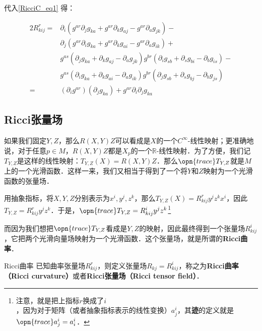代入\autoref{RicciC_eq1} 得：

\begin{equation}
\begin{aligned}
2R^r_{kij}=&\partial_i(g^{ar}\partial_jg_{ka}+g^{ar}\partial_kg_{aj}-g^{ar}\partial_ag_{jk})-\\
&\partial_j(g^{ar}\partial_ig_{ka}+g^{ar}\partial_kg_{ai}-g^{ar}\partial_ag_{ik})+\\
&g^{as}(\partial_jg_{ka}+\partial_kg_{aj}-\partial_ag_{jk})g^{br}(\partial_ig_{sb}+\partial_sg_{bi}-\partial_bg_{is})-\\
&g^{as}(\partial_ig_{ka}+\partial_kg_{ai}-\partial_ag_{ik})g^{br}(\partial_jg_{sb}+\partial_sg_{bj}-\partial_bg_{js})\\
=&(\partial_ig^{ar})(\partial_jg_{ka})+g^{ar}\partial_i\partial_jg_{ka}
\end{aligned}
\end{equation}

















\subsection{Ricci张量场}

如果我们固定$Y, Z$，那么$R(X, Y)Z$可以看成是$X$的一个$C^{\infty}$-线性映射；更准确地说，对于任意$p\in M$，$R(X, Y)Z$都是$X_p$的一个$\mathbb{R}$-线性映射．为了方便，我们记$T_{Y, Z}$是这样的线性映射：$T_{Y, Z}(X)=R(X, Y)Z$．那么$\opn{trace}T_{Y, Z}$就是$M$上的一个光滑函数．这样一来，我们又相当于得到了一个将$Y$和$Z$映射为一个光滑函数的张量场．

用抽象指标，将$X, Y, Z$分别表示为$x^i, y^j, z^k$，那么$T_{Y, Z}(X)=R^r_{kij}y^jz^kx^i$，因此$T_{Y, Z}=R^r_{kij}y^jz^k$．于是，$\opn{trace}T_{Y, Z}=R^i_{kij}y^jz^k$\footnote{注意，就是把上指标$r$换成了$i$，因为对于矩阵（或者抽象指标表示的线性变换）$a^i_j$，其\textbf{迹}的定义就是$\opn{trace}a^i_j=a^i_i$．}

而因为我们想把$\opn{trace}T_{Y, Z}$看成是$Y, Z$的映射，因此最终得到一个张量场$R^i_{kij}$，它把两个光滑向量场映射为一个光滑函数．这个张量场，就是所谓的\textbf{Ricci曲率}．

\begin{definition}{Ricci曲率}
已知曲率张量场$R^r_{kij}$，则定义张量场$R_{kj}=R^i_{kij}$，称之为\textbf{Ricci曲率（Ricci curvature）}或者\textbf{Ricci张量场（Ricci tensor field）}．
\end{definition}

